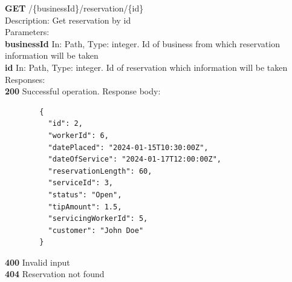 \documentclass[11pt,a4paper,pdftex]{article}
\begin{document}
\hspace*{1em}\textbf{GET} /\{businessId\}/reservation/\{id\}\\
\hspace*{2em}Description: Get reservation by id\\
\hspace*{2em}Parameters:\\
\hspace*{3em}\textbf{businessId} In: Path, Type: integer. Id of business from which reservation information will be taken\\
\hspace*{3em}\textbf{id} In: Path, Type: integer. Id of reservation which information will be taken\\
\hspace*{2em}Responses:\\
\hspace*{3em}\textbf{200} Successful operation. Response body:
\begin{verbatim}
        {
          "id": 2,
          "workerId": 6,
          "datePlaced": "2024-01-15T10:30:00Z",
          "dateOfService": "2024-01-17T12:00:00Z",
          "reservationLength": 60,
          "serviceId": 3,
          "status": "Open",
          "tipAmount": 1.5,
          "servicingWorkerId": 5,
          "customer": "John Doe"
        }
\end{verbatim}
\hspace*{3em}\textbf{400} Invalid input\\
\hspace*{3em}\textbf{404} Reservation not found
\end{document}
